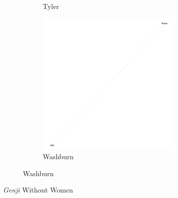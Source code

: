 \documentclass[12pt]{article}
\begin{document}
\begin{flushleft}
\begin{spacing}{2.0}
\begin{figure}
\begin{subfigure}{\linewidth}
\begin{subfigure}{.5\linewidth}
	  		\caption{Tyler}		
		\end{subfigure}
		\begin{subfigure}{.5\linewidth}
	  		\includegraphics[width=3in]{washburn-no-womenwords.png}\hfill
	  		\caption{Washburn}		
		\end{subfigure}
	\end{subfigure}
	\caption{\textit{Genji} Without Women}
	\label{networks-without-women}
\end{figure}


\end{spacing}
\end{flushleft}
\end{document}
